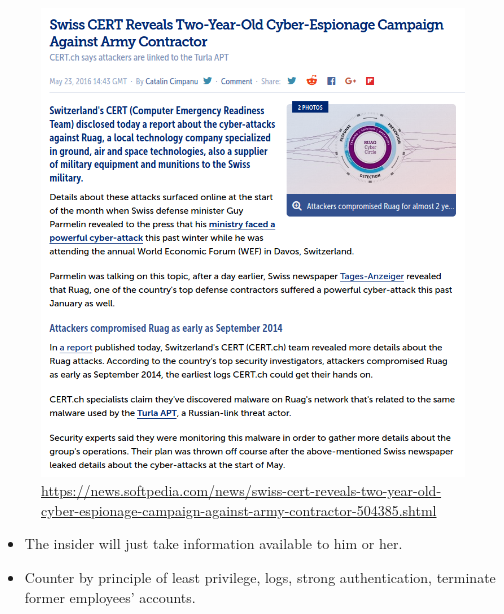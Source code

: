\begin{frame}
  \begin{figure}
    \includegraphics[width=\columnwidth]{figs/ruag-turla.png}
    \caption{\url{https://news.softpedia.com/news/swiss-cert-reveals-two-year-old-cyber-espionage-campaign-against-army-contractor-504385.shtml}}
  \end{figure}
\end{frame}

\begin{frame}
  \begin{example}[Insider]
    \begin{itemize}
      \item The insider will just take information available to him or her.
      \item Counter by principle of least privilege, logs, strong 
        authentication, terminate former employees' accounts.
    \end{itemize}
  \end{example}
\end{frame}

